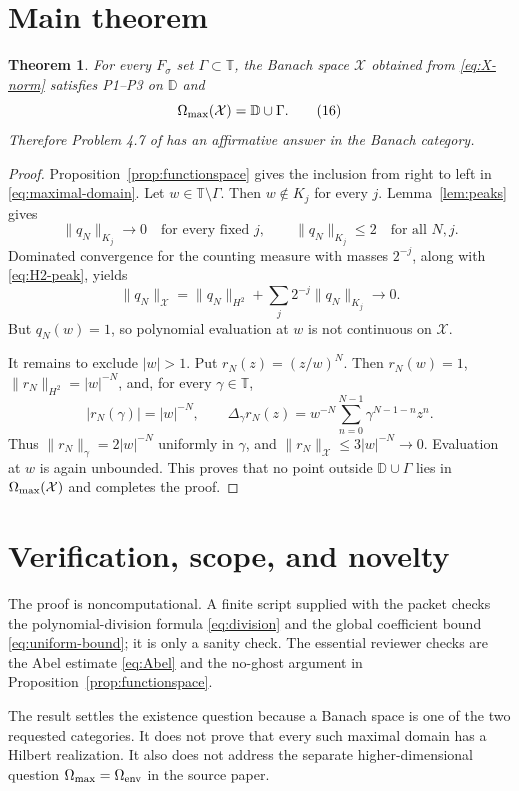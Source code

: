 \documentclass[11pt]{article}
\newtheorem{theorem}{Theorem}
\newcommand{\D}{\mathbb D}
\newcommand{\T}{\mathbb T}
\newcommand{\X}{\mathcal X}
\newcommand{\Om}{\Omega_{\rm max}}
\begin{document}
\section{Main theorem}

\begin{theorem}\label{thm:main}
For every $F_\sigma$ set $\Gamma\subset\T$, the Banach space $\X$ obtained
from \eqref{eq:X-norm} satisfies P1--P3 on $\D$ and
\[
 \Om(\X)=\D\cup\Gamma.
 \tag{16}\label{eq:maximal-domain}
\]
Therefore Problem 4.7 of \cite{MS} has an affirmative answer in the Banach
category.
\end{theorem}

\begin{proof}
Proposition~\ref{prop:functionspace} gives the inclusion from right to left
in \eqref{eq:maximal-domain}.  Let $w\in\T\setminus\Gamma$.  Then $w\notin K_j$ for every
$j$.  Lemma~\ref{lem:peaks} gives
\[
 \|q_N\|_{K_j}\longrightarrow0\quad\text{for every fixed }j,
 \qquad
 \|q_N\|_{K_j}\le2\quad\text{for all }N,j.
\]
Dominated convergence for the counting measure with masses $2^{-j}$, along
with \eqref{eq:H2-peak}, yields
\[
 \|q_N\|_{\X}
 =\|q_N\|_{H^2}+\sum_j2^{-j}\|q_N\|_{K_j}\longrightarrow0.
\]
But $q_N(w)=1$, so polynomial evaluation at $w$ is not continuous on $\X$.

It remains to exclude $|w|>1$.  Put $r_N(z)=(z/w)^N$.  Then
$r_N(w)=1$, $\|r_N\|_{H^2}=|w|^{-N}$, and, for every $\gamma\in\T$,
\[
 |r_N(\gamma)|=|w|^{-N},\qquad
 \Delta_\gamma r_N(z)
 =w^{-N}\sum_{n=0}^{N-1}\gamma^{N-1-n}z^n.
\]
Thus $\|r_N\|_\gamma=2|w|^{-N}$ uniformly in $\gamma$, and
$\|r_N\|_{\X}\le3|w|^{-N}\to0$.  Evaluation at $w$ is again unbounded.
This proves that no point outside $\D\cup\Gamma$ lies in $\Om(\X)$ and
completes the proof.
\end{proof}

\section{Verification, scope, and novelty}

The proof is noncomputational.  A finite script supplied with the packet
checks the polynomial-division formula \eqref{eq:division} and the global coefficient
bound \eqref{eq:uniform-bound}; it is only a sanity check.  The essential reviewer checks
are the Abel estimate \eqref{eq:Abel} and the no-ghost argument in
Proposition~\ref{prop:functionspace}.

The result settles the existence question because a Banach space is one of
the two requested categories.  It does not prove that every such maximal
domain has a Hilbert realization.  It also does not address the separate
higher-dimensional question $\Om=\Omega_{\rm env}$ in the source paper.
\end{document}

